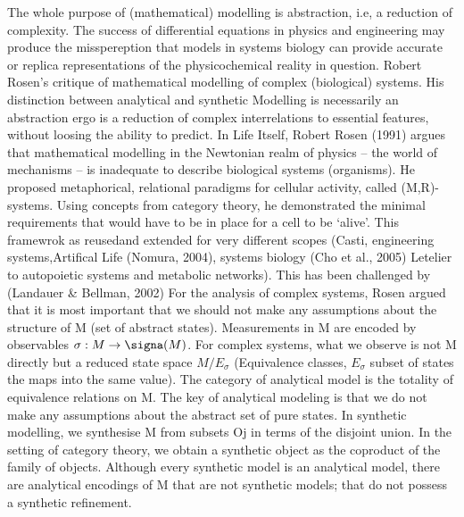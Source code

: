\documentclass[onecollarge,runningheads]{svjour2}
\begin{document}
The whole purpose of (mathematical) modelling is abstraction, i.e, a reduction of complexity. %
The success of differential equations in physics and engineering may produce the misspereption that models in systems biology can provide accurate or replica representations of the physicochemical reality in question. 
Robert Rosen’s critique of mathematical modelling of complex (biological) systems. His distinction between analytical and synthetic
Modelling is necessarily an abstraction ergo is a reduction of complex interrelations to essential features, without loosing the ability to predict. %
In Life Itself, Robert Rosen (1991) argues that mathematical modelling in the Newtonian realm of physics – the world of mechanisms – is inadequate to describe biological systems (organisms).
He proposed metaphorical, relational paradigms for cellular activity, called (M,R)-systems. Using concepts from category theory, he demonstrated the minimal requirements that would have to be in place for a cell to be ‘alive’. This framewrok as reusedand extended for very different scopes (Casti, engineering systems,Artifical Life (Nomura, 2004), systems biology (Cho et al., 2005) Letelier to autopoietic systems and metabolic networks). This has been challenged by (Landauer & Bellman, 2002) %
For the analysis of complex systems, Rosen argued that it is most important that we should not make any assumptions about the structure of M (set of abstract states). Measurements in M are encoded by observables $\sigma: M \to \signa(M)$.
For complex systems, what we observe is not M directly but a reduced state space $M/E_\sigma$ (Equivalence classes, $E_\sigma$ subset of states the maps into the same value). The category of analytical model is the totality of equivalence relations on M. The key of analytical modeling is that we do not make any assumptions about the abstract set of pure states. In synthetic modelling, we synthesise M from subsets Oj in terms of the disjoint union. In the setting of category theory, we obtain a synthetic object as the coproduct of the family of objects. Although every synthetic model is an analytical model, there are analytical encodings of M that are not synthetic models; that do not possess a synthetic refinement.
\end{document}
